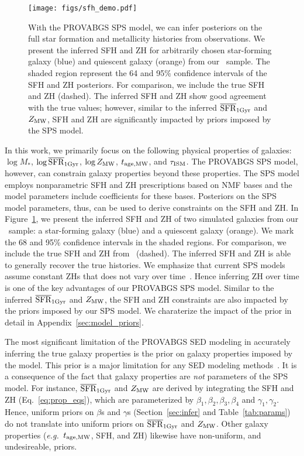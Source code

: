 \begin{figure}
\begin{center}
\texttt{[image: figs/sfh\_demo.pdf]}
    \caption{
        With the {\sc PROVABGS} SPS model, we can infer posteriors on the full
        star formation and metallicity histories from observations. 
        We present the inferred SFH and ZH for arbitrarily chosen star-forming
        galaxy (blue) and quiescent galaxy (orange) from our \lgal~sample.
        The shaded region represent the 64 and 95\% confidence intervals of the
        SFH and ZH posteriors. 
        For comparison, we include the true SFH and ZH (dashed). 
        The inferred SFH and ZH show good agreement with the true values;
        however, similar to the inferred $\overline{\rm SFR}_{\rm 1Gyr}$ and $Z_{\rm MW}$, SFH and ZH are
        significantly impacted by priors imposed by the SPS model. 
    } \label{fig:sfh_demo}
\end{center}
\end{figure}


In this work, we primarily focus on the following physical properties of
galaxies: $\log M_*$, $\log\overline{\rm SFR}_{\rm 1Gyr}$, $\log Z_{\rm MW}$, $t_{\rm age, MW}$, and $\tau_{\rm ISM}$. 
The {\sc PROVABGS} SPS model, however, can constrain galaxy properties beyond
these properties. 
The SPS model employs nonparametric SFH and ZH prescriptions based on NMF bases
and the model parameters include coefficients for these bases. 
Posteriors on the SPS model parameters, thus, can be used to derive constraints
on the SFH and ZH. 
In Figure~\ref{fig:sfh_demo}, we present the inferred SFH and ZH of two
simulated galaxies from our \lgal~sample: a star-forming galaxy (blue) and a
quiescent galaxy (orange). 
We mark the 68 and 95\% confidence intervals in the shaded regions. 
For comparison, we include the true SFH and ZH from \lgal~(dashed).  
The inferred SFH and ZH is able to generally recover the true histories. 
We emphasize that current SPS models assume constant ZHs that does not vary
over time~\citep{carnall2017, leja2019}. 
Hence inferring ZH over time is one of the key advantages of our {\sc PROVABGS}
SPS model. 
Similar to the inferred $\overline{\rm SFR}_{\rm 1Gyr}$ and $Z_{\rm MW}$, the SFH and ZH constraints are
also impacted by the priors imposed by our SPS model. 
We charaterize the impact of the prior in detail in
Appendix~\ref{sec:model_priors}.

The most significant limitation of the {\sc PROVABGS} SED modeling in
accurately inferring the true galaxy properties is the prior on galaxy
properties imposed by the model. 
This prior is a major limitation for any SED modeling
methods~\citep{carnall2017, leja2019}. 
It is a consequence of the fact that galaxy properties are \emph{not}
parameters of the SPS model.
For instance, $\overline{\rm SFR}_{\rm 1Gyr}$ and $Z_{\rm MW}$ are derived by integrating the SFH and ZH
(Eq.~\ref{eq:prop_eqs}), which are parameterized by $\beta_1, \beta_2, \beta_3,
\beta_4$ and $\gamma_1, \gamma_2$. 
Hence, uniform priors on $\beta$s and $\gamma$s (Section~\ref{sec:infer} and
Table~\ref{tab:params}) do not translate into uniform priors on $\overline{\rm SFR}_{\rm 1Gyr}$ and
$Z_{\rm MW}$.
Other galaxy properties (\emph{e.g.}~$t_{\rm age, MW}$, SFH, and ZH) likewise have
non-uniform, and undesireable, priors. 

